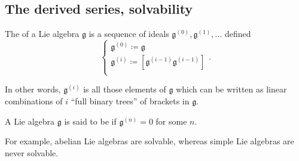 \documentclass{article}
\newcommand{\lb}[1]{\ensuremath{\left[{#1}\right]}}
\newcommand{\frkg}{{\ensuremath{\mathfrak{g}}}}
\begin{document}
\subsection{The derived series, solvability}

\begin{definition}
    The  of a Lie algebra $\frkg$ is a sequence of ideals $\frkg^{(0)}, \frkg^{(1)}, \ldots$ defined
    \[
        \begin{cases}
            \frkg^{(0)} \coloneq \frkg \\
            \frkg^{(i)} \coloneq \lb{\frkg^{(i-1)}\frkg^{(i-1)}} \\
        \end{cases}.
    \]
\end{definition}

In other words, $\frkg^{(i)}$ is all those elements of $\frkg$ which can be written as linear combinations of $i$ ``full binary trees'' of brackets in $\frkg$.

\begin{definition}
    A Lie algebra $\frkg$ is said to be  if $\frkg^{(n)} = 0$ for some $n$.
\end{definition}

For example, abelian Lie algebras are solvable, whereas simple Lie algebras are never solvable.
\end{document}
